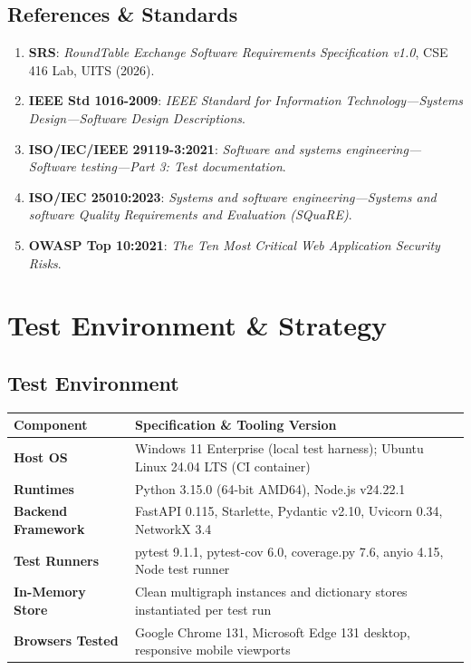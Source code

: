 \documentclass[12pt,a4paper]{report}
\begin{document}
\section{References \& Standards}
\begin{enumerate}
    \item \textbf{SRS}: \textit{RoundTable Exchange Software Requirements Specification v1.0}, CSE 416 Lab, UITS (2026).
    \item \textbf{IEEE Std 1016-2009}: \textit{IEEE Standard for Information Technology---Systems Design---Software Design Descriptions}.
    \item \textbf{ISO/IEC/IEEE 29119-3:2021}: \textit{Software and systems engineering---Software testing---Part 3: Test documentation}.
    \item \textbf{ISO/IEC 25010:2023}: \textit{Systems and software engineering---Systems and software Quality Requirements and Evaluation (SQuaRE)}.
    \item \textbf{OWASP Top 10:2021}: \textit{The Ten Most Critical Web Application Security Risks}.
\end{enumerate}

\newpage

\chapter{Test Environment \& Strategy}

\section{Test Environment}
\begin{table}[ht]
\centering
\begin{tabularx}{\textwidth}{l X}
\toprule
\textbf{Component} & \textbf{Specification \& Tooling Version} \\
\midrule
\textbf{Host OS} & Windows 11 Enterprise (local test harness); Ubuntu Linux 24.04 LTS (CI container) \\
\textbf{Runtimes} & Python 3.15.0 (64-bit AMD64), Node.js v24.22.1 \\
\textbf{Backend Framework} & FastAPI 0.115, Starlette, Pydantic v2.10, Uvicorn 0.34, NetworkX 3.4 \\
\textbf{Test Runners} & pytest 9.1.1, pytest-cov 6.0, coverage.py 7.6, anyio 4.15, Node test runner \\
\textbf{In-Memory Store} & Clean multigraph instances and dictionary stores instantiated per test run \\
\textbf{Browsers Tested} & Google Chrome 131, Microsoft Edge 131 desktop, responsive mobile viewports \\
\bottomrule
\end{tabularx}
\end{table}
\end{document}
